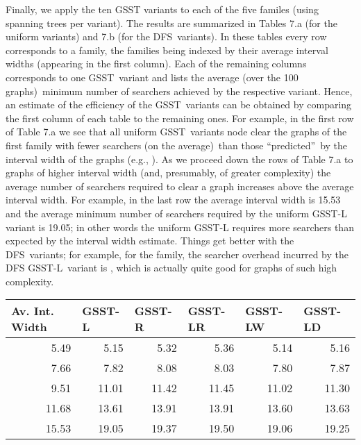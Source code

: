 \documentclass[11pt]{article}\usepackage{amsmath}
\begin{document}
Finally, we apply the ten GSST variants to each of the five familes (using
 spanning trees per variant). The results are summarized in
Tables 7.a (for the uniform variants) and 7.b (for the DFS\ variants). In
these tables every row corresponds to a family, the families being indexed by
their average interval widths (appearing in the first column). Each of the
remaining columns corresponds to one GSST\ variant and lists the average (over
the 100 graphs)\ minimum number of searchers achieved by the respective
variant. Hence, an estimate of the efficiency of the GSST\ variants can be
obtained by comparing the first column of each table to the remaining ones.
For example, in the first row of Table 7.a we see that all uniform
GSST\ variants node clear the graphs of the first family with fewer searchers
(on the average)\ than those \textquotedblleft predicted\textquotedblright\ by
the interval width of the graphs (e.g., ). As we proceed down the
rows of Table 7.a to graphs of higher interval width (and, presumably, of
greater complexity) the average number of searchers required to clear a graph
increases above the average interval width. For example, in the last row the
average interval width is 15.53 and the average minimum number of searchers
required by the uniform GSST-L variant is 19.05; in other words the uniform
GSST-L requires  more searchers
than expected by the interval width estimate. Things get better with the
DFS\ variants; for example, for the  family,
the searcher overhead incurred by the DFS GSST-L\ variant is , which is actually quite good for
graphs of such high complexity.

\begin{center}\begin{tabular}
[c]{|l|l|l|l|l|l|}\hline
\textbf{Av. Int. Width} & \textbf{GSST-L} & \textbf{GSST-R} & \textbf{GSST-LR}
& \textbf{GSST-LW} & \textbf{GSST-LD}\\\hline
\multicolumn{1}{|r|}{5.49} & \multicolumn{1}{|r|}{5.15} &
\multicolumn{1}{|r|}{5.32} & \multicolumn{1}{|r|}{5.36} &
\multicolumn{1}{|r|}{5.14} & \multicolumn{1}{|r|}{5.16}\\\hline
\multicolumn{1}{|r|}{7.66} & \multicolumn{1}{|r|}{7.82} &
\multicolumn{1}{|r|}{8.08} & \multicolumn{1}{|r|}{8.03} &
\multicolumn{1}{|r|}{7.80} & \multicolumn{1}{|r|}{7.87}\\\hline
\multicolumn{1}{|r|}{9.51} & \multicolumn{1}{|r|}{11.01} &
\multicolumn{1}{|r|}{11.42} & \multicolumn{1}{|r|}{11.45} &
\multicolumn{1}{|r|}{11.02} & \multicolumn{1}{|r|}{11.30}\\\hline
\multicolumn{1}{|r|}{11.68} & \multicolumn{1}{|r|}{13.61} &
\multicolumn{1}{|r|}{13.91} & \multicolumn{1}{|r|}{13.91} &
\multicolumn{1}{|r|}{13.60} & \multicolumn{1}{|r|}{13.63}\\\hline
\multicolumn{1}{|r|}{15.53} & \multicolumn{1}{|r|}{19.05} &
\multicolumn{1}{|r|}{19.37} & \multicolumn{1}{|r|}{19.50} &
\multicolumn{1}{|r|}{19.06} & \multicolumn{1}{|r|}{19.25}\\\hline
\end{tabular}



\end{center}
\end{document}
